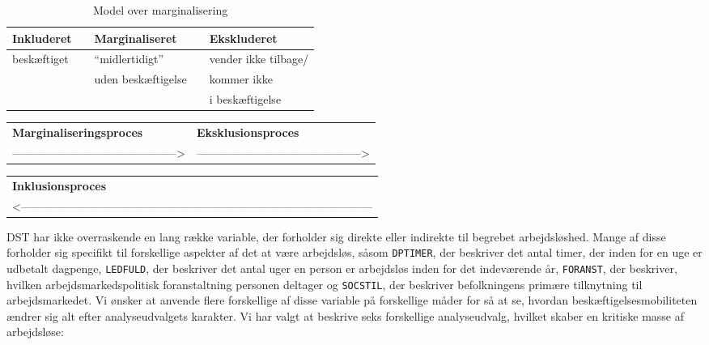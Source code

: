 % 
\begin{table}[H] \centering
\caption{Model over marginalisering}
\label{tab_marginaliseringsmodel_3}
\begin{tabular}{@{} m{} c m{} c m{} @{}} \toprule
\textbf{Inkluderet} & & \textbf{Marginaliseret} & & \textbf{Ekskluderet} \\ \midrule
  beskæftiget  & & “midlertidigt” & & vender ikke tilbage/ \\  
  & & uden beskæftigelse & & kommer ikke \\  
  & & & & i beskæftigelse \\  
\end{tabular} \end{table} %
\begin{table}[H] \centering
\label{tab_marginaliseringsmodel}
\begin{tabular}{@{} m{} m{} @{}} 
  \textbf{Marginaliseringsproces} & \textbf{Eksklusionsproces} \\  
  --------------------------------------------> & --------------------------------------------> \\ 
\end{tabular} \end{table} %
\begin{table}[H] \centering
\label{tab_marginaliseringsmodel}
\begin{tabular}{@{} m{} @{}} 
  \textbf{Inklusionsproces} \\  
  <--------------------------------------------------------------------------------------------- \\ \bottomrule
\end{tabular} \end{table}
%
DST har ikke overraskende en lang række variable, der forholder sig direkte eller indirekte til begrebet arbejdsløshed. Mange af disse forholder sig specifikt til forskellige aspekter af det at være arbejdsløs, såsom \texttt{DPTIMER}, der beskriver det antal timer, der inden for en uge er udbetalt dagpenge, \texttt{LEDFULD}, der beskriver det antal uger en person er arbejdsløs inden for det indeværende år, \texttt{FORANST}, der beskriver, hvilken arbejdsmarkedspolitisk foranstaltning personen deltager og \texttt{SOCSTIL}, der beskriver befolkningens primære tilknytning til arbejdsmarkedet. Vi ønsker at anvende flere forskellige af disse variable på forskellige måder for så at se, hvordan beskæftigelsesmobiliteten ændrer sig alt efter analyseudvalgets karakter. Vi har valgt at beskrive seks forskellige analyseudvalg, hvilket skaber en kritiske masse af arbejdsløse:
